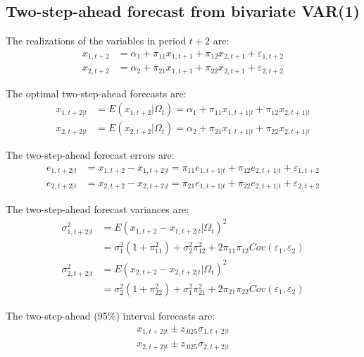 \documentclass[
  oneside]{book}
\begin{document}
\hypertarget{two-step-ahead-forecast-from-bivariate-var1}{%
\subsection{Two-step-ahead forecast from bivariate VAR(1)}\label{two-step-ahead-forecast-from-bivariate-var1}}

The realizations of the variables in period \(t+2\) are:
\[\begin{aligned}
x_{1,t+2} &= \alpha_1 + \pi_{11} x_{1,t+1} + \pi_{12} x_{2,t+1} + \varepsilon_{1,t+2} \\
x_{2,t+2} &= \alpha_2 + \pi_{21} x_{1,t+1} + \pi_{22} x_{2,t+1} + \varepsilon_{2,t+2}
\end{aligned}\]

The optimal two-step-ahead forecasts are:
\[\begin{aligned}
x_{1,t+2|t} &= E(x_{1,t+2}|\Omega_t) = \alpha_1 + \pi_{11} x_{1,t+1|t} + \pi_{12} x_{2,t+1|t} \\
x_{2,t+2|t} &= E(x_{2,t+2}|\Omega_t) = \alpha_2 + \pi_{21} x_{1,t+1|t} + \pi_{22} x_{2,t+1|t}
\end{aligned}\]

The two-step-ahead forecast errors are:
\[\begin{aligned}
e_{1,t+2|t} &= x_{1,t+2} - x_{1,t+2|t} = \pi_{11} e_{1,t+1|t} + \pi_{12} e_{2,t+1|t} + \varepsilon_{1,t+2} \\
e_{2,t+2|t} &= x_{2,t+2} - x_{2,t+2|t} = \pi_{21} e_{1,t+1|t} + \pi_{22} e_{2,t+1|t} + \varepsilon_{2,t+2}
\end{aligned}\]

The two-step-ahead forecast variances are:
\[\begin{aligned}
\sigma_{1,t+2|t}^2 &= E(x_{1,t+2} - x_{1,t+2|t}|\Omega_t)^2 \\ 
&= \sigma_{1}^2(1+\pi_{11}^2) + \sigma_{2}^2\pi_{12}^2 + 2\pi_{11}\pi_{12} Cov(\varepsilon_{1},\varepsilon_{2})\\
\sigma_{2,t+2|t}^2 &= E(x_{2,t+2} - x_{2,t+2|t}|\Omega_t)^2 \\ 
&= \sigma_{2}^2(1+\pi_{22}^2) + \sigma_{1}^2\pi_{21}^2 + 2\pi_{21}\pi_{22} Cov(\varepsilon_{1},\varepsilon_{2})
\end{aligned}\]

The two-step-ahead (95\%) interval forecasts are:
\[\begin{aligned}
x_{1,t+2|t} \pm z_{.025}\sigma_{1,t+2|t} \\
x_{2,t+2|t} \pm z_{.025}\sigma_{2,t+2|t}
\end{aligned}\]
\end{document}
